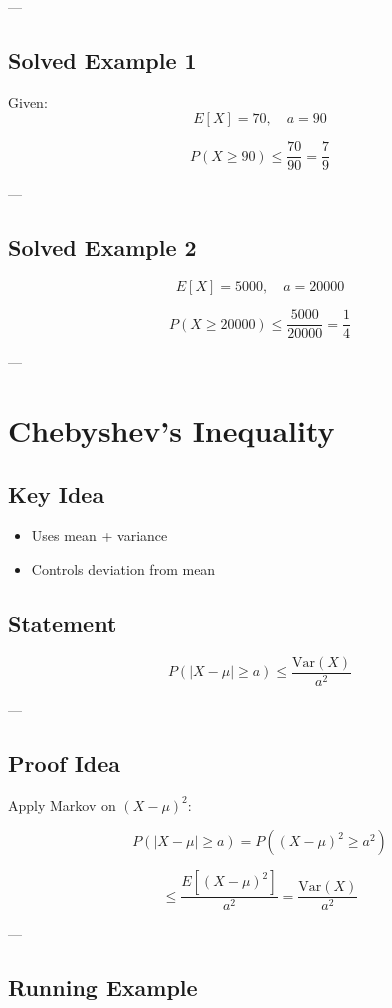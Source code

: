 \documentclass[12pt]{article}
\begin{document}
---

\subsection{Solved Example 1}

Given:
\[
E[X] = 70, \quad a = 90
\]

\[
P(X \ge 90) \le \frac{70}{90} = \frac{7}{9}
\]

---

\subsection{Solved Example 2}

\[
E[X] = 5000, \quad a = 20000
\]

\[
P(X \ge 20000) \le \frac{5000}{20000} = \frac{1}{4}
\]

---

\section{Chebyshev's Inequality}

\subsection{Key Idea}
\begin{itemize}
    \item Uses mean + variance
    \item Controls deviation from mean
\end{itemize}

\subsection{Statement}

\[
P(|X - \mu| \ge a) \le \frac{\text{Var}(X)}{a^2}
\]

---

\subsection{Proof Idea}

Apply Markov on $(X - \mu)^2$:

\[
P(|X - \mu| \ge a) = P((X-\mu)^2 \ge a^2)
\]

\[
\le \frac{E[(X-\mu)^2]}{a^2}
= \frac{\text{Var}(X)}{a^2}
\]

---

\subsection{Running Example}
\end{document}
